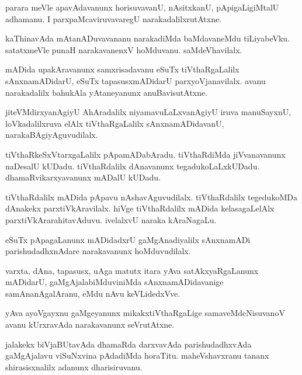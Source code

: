 \documentclass{article}
\begin{document}
\begin{mn}
parara meVle apavAdavanunx horisuvavanU, nAsitxkanU, pApigaLigiMtalU adhamanu. I 
parxpaMcaviruvavaregU narakadalilxrutAtxne.
\end{mn}

\begin{mn}
kaThinavAda mAtanADuvavananu narakadiMda baMdavaneMdu tiLiyabeVku. satatxmeVle punaH 
narakavanenxV hoMduvanu. saMdeVhavilalx.
\end{mn}

\begin{mn}
mADida upakAravanunx samxrisadavanu eSuTx tiVthaRgaLalilx sAnxnamADidarU, eSuTx tapasusxmADidarU
parxyoVjanavilalx. avanu narakadalilx bahukAla yAtaneyanunx anuBavisutAtxne.
\end{mn}

\begin{mn}
jiteVMdirxyanAgiyU AhAradalilx niyamavuLaLxvanAgiyU iruva manuSayxnU, loVkadalilxruva elAlx 
tiVthaRgaLalilx  sAnxnamADidavanU, narakaBAgiyAguvudilalx.
\end{mn}

\begin{mn}
tiVthaRkeSxVtarxgaLalilx pApamADabAradu. tiVthaRdiMda jiVvanavanunx naDesalU kUDadu. tiVthaRdalilx 
dAnavanunx tegadukoLaLxkUDadu. dhamaRvikarxyavanunx mADalU kUDadu.
\end{mn}

\begin{mn}
tiVthaRdalilx mADida pApavu nAshavAguvudilalx. tiVthaRdalilx tegedukoMDa dAnakekx parxtiVkAravilalx.
hiVge tiVthaRdalilx mADida kelasagaLelAlx parxtiVkArarahitavAduvu. ivelalxvU naraka kAraNagaLu.
\end{mn}

\begin{mn}
eSuTx pApagaLanunx mADidadxrU gaMgAnadiyalilx sAnxnamADi parishudadhxnAdare narakavanunx 
hoMduvudilalx.
\end{mn}

\begin{mn}
varxta, dAna, tapasusx, uAga matutx itara yAva satAkxyaRgaLanunx mADidarU, gaMgAjalabiMduviniMda 
sAnxnamADidavanige samAnanAgalAranu, eMdu nAvu keVLidedxVve.
\end{mn}

\begin{mn}
yAva ayoVgayxnu gaMgeyanunx mikakxtiVthaRgaLige samaveMdeNisuvanoV avanu kUrxravAda narakavanunx 
seVrutAtxne.
\end{mn}

\begin{mn}
jalakekx biVjaBUtavAda dhamaRda darxvavAda parishudadhxvAda gaMgAjalavu viSuNxvina pAdadiMda 
horaTitu. maheVshavxranu tananx shirasisxnalilx adanunx dharisiruvanu.
\end{mn}
\end{document}
